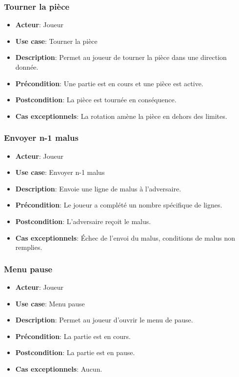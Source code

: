 \documentclass{article}
\begin{document}
\subsubsection*{Tourner la pièce}
\begin{itemize}
    \item \textbf{Acteur}: Joueur
    \item \textbf{Use case}: Tourner la pièce
    \item \textbf{Description}: Permet au joueur de tourner la pièce dans une direction donnée.
    \item \textbf{Précondition}: Une partie est en cours et une pièce est active.
    \item \textbf{Postcondition}: La pièce est tournée en conséquence.
    \item \textbf{Cas exceptionnels}: La rotation amène la pièce en dehors des limites.
\end{itemize}

\subsubsection*{Envoyer n-1 malus}
\begin{itemize}
    \item \textbf{Acteur}: Joueur
    \item \textbf{Use case}: Envoyer n-1 malus
    \item \textbf{Description}: Envoie une ligne de malus à l'adversaire.
    \item \textbf{Précondition}: Le joueur a complété un nombre spécifique de lignes.
    \item \textbf{Postcondition}: L'adversaire reçoit le malus.
    \item \textbf{Cas exceptionnels}: Échec de l’envoi du malus, conditions de malus non remplies.
\end{itemize}

\subsubsection*{Menu pause}
\begin{itemize}
    \item \textbf{Acteur}: Joueur
    \item \textbf{Use case}: Menu pause
    \item \textbf{Description}: Permet au joueur d'ouvrir le menu de pause.
    \item \textbf{Précondition}: La partie est en cours.
    \item \textbf{Postcondition}: La partie est en pause.
    \item \textbf{Cas exceptionnels}: Aucun.
\end{itemize}
\end{document}
